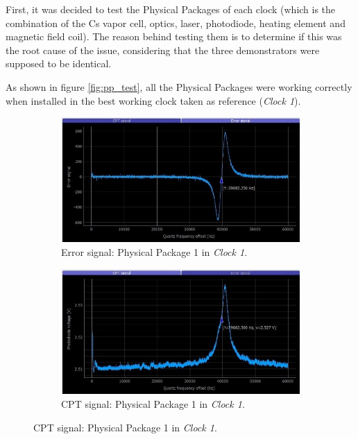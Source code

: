 \documentclass[a4paper,12pt]{article}
\begin{document}
First, it was decided to test the Physical Packages of each clock (which is the combination of the Cs vapor cell, optics, laser, photodiode, heating element and magnetic field coil). The reason behind testing them is to determine if this was the root cause of the issue, considering that the three demonstrators were supposed to be identical.

As shown in figure \ref{fig:pp_test}, all the Physical Packages were working correctly when installed in the best working clock taken as reference (\textit{Clock 1}).

\begin{figure}[!h]
\centering
\begin{subfigure}[b]{0.49\textwidth}
\centering
\includegraphics[height=0.5\textwidth]{Images/c1_pp1_1_2.jpg}
\captionsetup{justification=centering}
\caption{Error signal: Physical Package 1 in \textit{Clock 1}.}
\end{subfigure}
\hfill
\begin{subfigure}[b]{0.49\textwidth}
\centering
\includegraphics[height=0.5\textwidth]{Images/c1_pp1_2_2.jpg}
\captionsetup{justification=centering}
\caption{CPT signal: Physical Package 1 in \textit{Clock 1}.}
\end{subfigure}


\end{figure}
\end{document}
